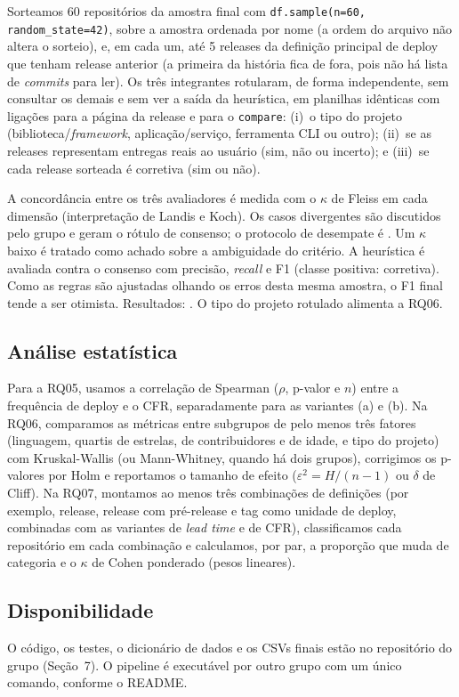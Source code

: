 Sorteamos 60 repositórios da amostra final com \texttt{df.sample(n=60,
random\_state=42)}, sobre a amostra ordenada por nome (a ordem do arquivo não
altera o sorteio), e, em cada um, até 5 releases da definição principal de
deploy que tenham release anterior (a primeira da história fica de fora, pois
não há lista de \textit{commits} para ler). Os três integrantes rotularam, de
forma independente, sem consultar os demais e sem ver a saída da heurística, em
planilhas idênticas com ligações para a página da release e para o
\texttt{compare}: (i)~o tipo do projeto (biblioteca/\textit{framework},
aplicação/serviço, ferramenta CLI ou outro); (ii)~se as releases representam
entregas reais ao usuário (sim, não ou incerto); e (iii)~se cada release
sorteada é corretiva (sim ou não).

A concordância entre os três avaliadores é medida com o $\kappa$ de Fleiss em
cada dimensão (interpretação de Landis e Koch). Os casos divergentes são
discutidos pelo grupo e geram o rótulo de consenso; o protocolo de desempate é
. Um $\kappa$ baixo é
tratado como achado sobre a ambiguidade do critério. A heurística é avaliada
contra o consenso com precisão, \textit{recall} e F1 (classe positiva:
corretiva). Como as regras são ajustadas olhando os erros desta mesma amostra, o
F1 final tende a ser otimista. Resultados: . O tipo do projeto rotulado alimenta a RQ06.

\subsection{Análise estatística}
\label{sec:analise}

Para a RQ05, usamos a correlação de Spearman ($\rho$, p-valor e $n$) entre a
frequência de deploy e o CFR, separadamente para as variantes (a) e (b). Na RQ06,
comparamos as métricas entre subgrupos de pelo menos três fatores (linguagem,
quartis de estrelas, de contribuidores e de idade, e tipo do projeto) com
Kruskal-Wallis (ou Mann-Whitney, quando há dois grupos), corrigimos os p-valores
por Holm e reportamos o tamanho de efeito ($\varepsilon^2 = H/(n-1)$ ou
$\delta$ de Cliff). Na RQ07, montamos ao menos três combinações de definições
(por exemplo, release, release com pré-release e tag como unidade de deploy,
combinadas com as variantes de \textit{lead time} e de CFR), classificamos cada
repositório em cada combinação e calculamos, por par, a proporção que muda de
categoria e o $\kappa$ de Cohen ponderado (pesos lineares).

\subsection{Disponibilidade}

O código, os testes, o dicionário de dados e os CSVs finais estão no
repositório do grupo (Seção~7). O pipeline é executável por outro grupo com um
único comando, conforme o README.
